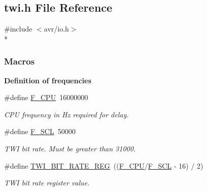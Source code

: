 \hypertarget{a00004}{}\subsection{twi.\+h File Reference}
\label{a00004}
{\ttfamily \#include $<$avr/io.\+h$>$}\\*
\subsubsection*{Macros}
\begin{Indent}{\bf Definition of frequencies}\par
\begin{DoxyCompactItemize}
\item 
\#define \hyperlink{a00008_ga43bafb28b29491ec7f871319b5a3b2f8}{F\+\_\+\+C\+PU}~16000000
\begin{DoxyCompactList}\small\item\em C\+PU frequency in Hz required for delay. \end{DoxyCompactList}\item 
\#define \hyperlink{a00008_ga7a1c522bed64982971384489ee477bd3}{F\+\_\+\+S\+CL}~50000
\begin{DoxyCompactList}\small\item\em T\+WI bit rate. Must be greater than 31000. \end{DoxyCompactList}\item 
\#define \hyperlink{a00008_ga801c158406ca2334b446e442a2debe37}{T\+W\+I\+\_\+\+B\+I\+T\+\_\+\+R\+A\+T\+E\+\_\+\+R\+EG}~((\hyperlink{a00008_ga43bafb28b29491ec7f871319b5a3b2f8}{F\+\_\+\+C\+PU}/\hyperlink{a00008_ga7a1c522bed64982971384489ee477bd3}{F\+\_\+\+S\+CL} -\/ 16) / 2)
\begin{DoxyCompactList}\small\item\em T\+WI bit rate register value. \end{DoxyCompactList}\end{DoxyCompactItemize}
\end{Indent}
